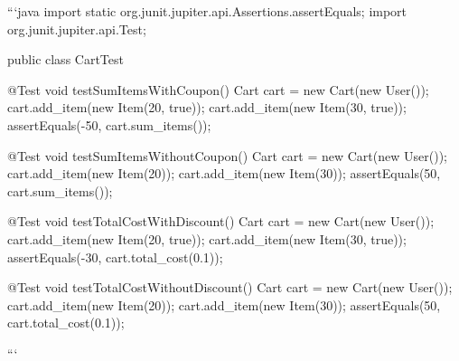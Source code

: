 \begin{response}
```java
import static org.junit.jupiter.api.Assertions.assertEquals;
import org.junit.jupiter.api.Test;

public class CartTest {

  @Test
  void testSumItemsWithCoupon() {
      Cart cart = new Cart(new User());
      cart.add_item(new Item(20, true));
      cart.add_item(new Item(30, true));
      assertEquals(-50, cart.sum_items());
  }

  @Test
  void testSumItemsWithoutCoupon() {
      Cart cart = new Cart(new User());
      cart.add_item(new Item(20));
      cart.add_item(new Item(30));
      assertEquals(50, cart.sum_items());
  }

  @Test
  void testTotalCostWithDiscount() {
      Cart cart = new Cart(new User());
      cart.add_item(new Item(20, true));
      cart.add_item(new Item(30, true));
      assertEquals(-30, cart.total_cost(0.1));
  }

  @Test
  void testTotalCostWithoutDiscount() {
      Cart cart = new Cart(new User());
      cart.add_item(new Item(20));
      cart.add_item(new Item(30));
      assertEquals(50, cart.total_cost(0.1));
  }
}
``` 
\end{response}
